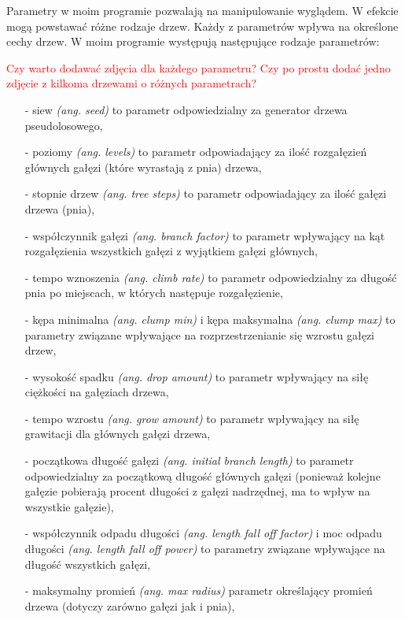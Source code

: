 \documentclass[a4paper,twoside,12pt]{report}
\begin{document}
Parametry w moim programie pozwalają na manipulowanie wyglądem. 
W efekcie mogą powstawać różne rodzaje drzew. 
Każdy z parametrów wpływa na określone cechy drzew. 
W moim programie występują następujące rodzaje parametrów:

\textcolor{red}{Czy warto dodawać zdjęcia 
dla każdego parametru? Czy po prostu dodać 
jedno zdjęcie z kilkoma drzewami o różnych parametrach?}

\begin{itemize}
\setlength\itemsep{1em}
	\item[-] siew \textit{(ang. seed)} to parametr odpowiedzialny za generator drzewa pseudolosowego,
	\item[-] poziomy \textit{(ang. levels)} to parametr odpowiadający za ilość rozgałęzień głównych gałęzi (które wyrastają z pnia) drzewa,
	\item[-] stopnie drzew \textit{(ang. tree steps)} to parametr odpowiadający za ilość gałęzi drzewa (pnia),
	\item[-] współczynnik gałęzi \textit{(ang. branch factor)} to parametr wpływający na kąt rozgałęzienia wszystkich gałęzi z wyjątkiem gałęzi głównych,
	\item[-] tempo wznoszenia \textit{(ang. climb rate)} to parametr odpowiedzialny za długość pnia po miejscach, w których następuje rozgałęzienie,
	\item[-] kępa minimalna \textit{(ang. clump min)} i kępa maksymalna \textit{(ang. clump max)} to parametry związane wpływające na rozprzestrzenianie się wzrostu gałęzi drzew,
	\item[-] wysokość spadku \textit{(ang. drop amount)} to parametr wpływający na siłę ciężkości na gałęziach drzewa,
	\item[-] tempo wzrostu \textit{(ang. grow amount)} to parametr wpływający na siłę grawitacji dla głównych gałęzi drzewa,
	\item[-] początkowa długość gałęzi \textit{(ang. initial branch length)} to parametr odpowiedzialny za początkową długość głównych gałęzi (ponieważ kolejne gałęzie pobierają procent długości z gałęzi nadrzędnej, ma to wpływ na wszystkie gałęzie),
	\item[-] współczynnik odpadu długości \textit{(ang. length fall off factor)} i moc odpadu długości \textit{(ang. length fall off power)} to parametry związane wpływające na długość wszystkich gałęzi,
	\item[-] maksymalny promień \textit{(ang. max radius)} parametr określający promień drzewa (dotyczy zarówno gałęzi jak i pnia),

\end{itemize}
\end{document}
